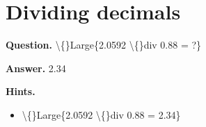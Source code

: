 \documentclass{article}
\begin{document}
\section*{Dividing decimals}
\textbf{Question.} \textbackslash\{\}Large\{2.0592 \textbackslash\{\}div
                    0.88 = ?\}

\textbf{Answer.} 2.34

\textbf{Hints.}
\begin{itemize}
  \item \textbackslash\{\}Large\{2.0592 \textbackslash\{\}div
                        0.88 =
                        2.34\}
\end{itemize}
\end{document}
